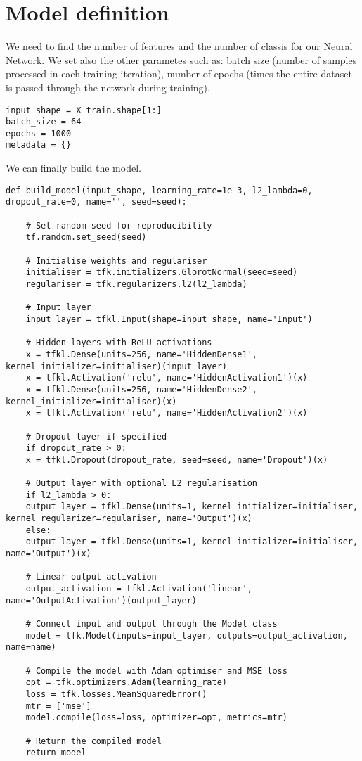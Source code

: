 \section{Model definition}

We need to find the number of features and the number of classis for our Neural Network. 
We set also the other parametes such as: batch size (number of samples processed in each training iteration), number of epochs (times the entire dataset is passed through the network during training).

\begin{lstlisting}[style=Python]
input_shape = X_train.shape[1:]
batch_size = 64
epochs = 1000
metadata = {}
\end{lstlisting}
We can finally build the model.
\begin{lstlisting}[style=Python]
def build_model(input_shape, learning_rate=1e-3, l2_lambda=0, dropout_rate=0, name='', seed=seed):

    # Set random seed for reproducibility
    tf.random.set_seed(seed)

    # Initialise weights and regulariser
    initialiser = tfk.initializers.GlorotNormal(seed=seed)
    regulariser = tfk.regularizers.l2(l2_lambda)

    # Input layer
    input_layer = tfkl.Input(shape=input_shape, name='Input')

    # Hidden layers with ReLU activations
    x = tfkl.Dense(units=256, name='HiddenDense1', kernel_initializer=initialiser)(input_layer)
    x = tfkl.Activation('relu', name='HiddenActivation1')(x)
    x = tfkl.Dense(units=256, name='HiddenDense2', kernel_initializer=initialiser)(x)
    x = tfkl.Activation('relu', name='HiddenActivation2')(x)

    # Dropout layer if specified
    if dropout_rate > 0:
    x = tfkl.Dropout(dropout_rate, seed=seed, name='Dropout')(x)

    # Output layer with optional L2 regularisation
    if l2_lambda > 0:
    output_layer = tfkl.Dense(units=1, kernel_initializer=initialiser, kernel_regularizer=regulariser, name='Output')(x)
    else:
    output_layer = tfkl.Dense(units=1, kernel_initializer=initialiser, name='Output')(x)

    # Linear output activation
    output_activation = tfkl.Activation('linear', name='OutputActivation')(output_layer)

    # Connect input and output through the Model class
    model = tfk.Model(inputs=input_layer, outputs=output_activation, name=name)

    # Compile the model with Adam optimiser and MSE loss
    opt = tfk.optimizers.Adam(learning_rate)
    loss = tfk.losses.MeanSquaredError()
    mtr = ['mse']
    model.compile(loss=loss, optimizer=opt, metrics=mtr)

    # Return the compiled model
    return model
\end{lstlisting}
